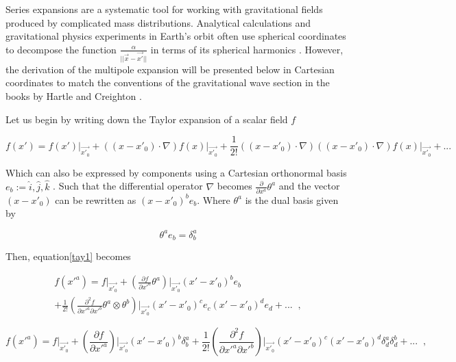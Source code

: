 Series expansions are a systematic tool for working with gravitational fields produced by complicated mass distributions. Analytical calculations and gravitational physics experiments  in Earth's orbit often use spherical coordinates to decompose the function $\frac{\alpha}{||\vec{x}-\vec{x'}||}$ in terms of its spherical harmonics \cite{Muller,kaula1966theory,Stirling:2017ybn}. However, the derivation of the multipole expansion will be presented below in Cartesian coordinates to match the conventions of the gravitational wave section in the books by Hartle \cite{Hartle:2021pel} and Creighton \cite{Creighton:2011zz}.

Let us begin by writing down the Taylor expansion of a scalar field $f$


\begin{equation}\label{tay1}
f(x') = f(x')\Biggr|_{\vec{x'_0}} + ((x-x'_0)\cdot \nabla) f(x)\Biggr|_{\vec{x'_0}} + \frac{1}{2!} ((x-x'_0)\cdot \nabla)((x-x'_0)\cdot \nabla) f(x)\Biggr|_{\vec{x'_0}} + ...
\end{equation}

Which can also be expressed by components using a Cartesian orthonormal basis $e_b:= {\hat{i}, \hat{j},\hat{k}}$ . Such that the differential operator $\nabla$ becomes $\frac{\partial}{\partial x^a} \theta^a$ and the vector $(x-x'_0)$ can be rewritten as $(x - x'_0)^b e_b$. Where $\theta^a$ is the dual basis given by 

$$\theta^a e_b= \delta^a_b$$

Then, equation\ref{tay1} becomes 

\begin{multline}
f(x'^a) = f\Biggr|_{\vec{x'_0}} + \left( \frac{\partial f}{\partial x'^a} \theta^a \right)\Biggr|_{\vec{x'_0}} (x' - x'_0)^b e_b \\ + \frac{1}{2!} \left( \frac{\partial^2 f}{\partial x'^a \partial x'^b} \theta^a \otimes \theta^b \right)\Biggr|_{\vec{x'_0}} (x' - x'_0)^c e_c (x' - x'_0)^d e_d + ...\;\; ,
\end{multline}

\begin{equation}\label{tay.exp}
f(x'^a) = f\Biggr|_{\vec{x'_0}} + \left( \frac{\partial f}{\partial x'^a} \right)\Biggr|_{\vec{x'_0}} (x' - x'_0)^b \delta^a_b + \frac{1}{2!} \left( \frac{\partial^2 f}{\partial x'^a \partial x'^b}  \right)\Biggr|_{\vec{x'_0}} (x' - x'_0)^c  (x' - x'_0)^d \delta^a_d \delta^b_d +   ... \;\; ,
\end{equation}

